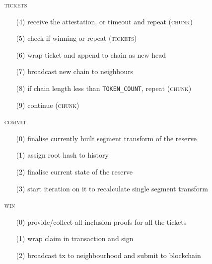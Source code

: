 \begin{definition}
\begin{itemize}[noitemsep]
\item[\textsc{\lowercase{tickets}}]
\item[]\begin{itemize}[noitemsep]
\item[(4)] receive the attestation, or timeout and repeat (\textsc{chunk})
\item[(5)] check if winning or repeat (\textsc{tickets}) 
\item[(6)] wrap ticket and append to chain as new head
\item[(7)] broadcast new chain to neighbours
\item[(8)] if chain length less than \texttt{TOKEN\_COUNT}, repeat (\textsc{chunk})
\item[(9)] continue (\textsc{chunk})
\end{itemize}
\item[\textsc{\lowercase{commit}}]
\item[]\begin{itemize}[noitemsep]
\item[(0)] finalise currently built segment transform of the reserve
\item[(1)]assign root hash to history
\item[(2)] finalise current state of the reserve 
\item[(3)] start iteration on it to recalculate single segment transform
\end{itemize}
\item[\textsc{\lowercase{win}}]
\item[]\begin{itemize}[noitemsep]
\item[(0)] provide/collect all inclusion proofs for all the tickets
\item[(1)] wrap claim in transaction and sign
\item[(2)] broadcast tx to neighbourhood and submit to blockchain
\end{itemize}
\end{itemize}
\end{definition}


